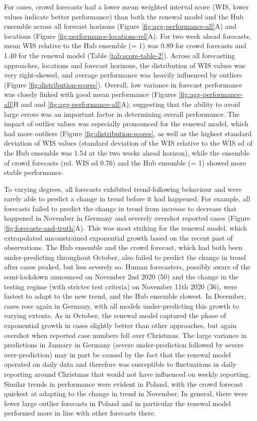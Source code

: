 \documentclass[
]{article}
\providecommand{\DIFaddtex}[1]{{\protect\color{blue}\uwave{#1}}} %
\providecommand{\DIFaddbegin}{} %
\providecommand{\DIFaddend}{} %
\providecommand{\DIFadd}[1]{\texorpdfstring{\DIFaddtex{#1}}{#1}} %
\newcommand{\DIFaddincludegraphics}[2][]{{\color{blue}\fbox{\DIFOincludegraphics[#1]{#2}}}} %
\DeclareRobustCommand{\DIFaddbegin}{\DIFOaddbegin \let\includegraphics\DIFaddincludegraphics} %
\DeclareRobustCommand{\DIFaddend}{\DIFOaddend \let\includegraphics\DIFOincludegraphics} %
\begin{document}
For cases, crowd forecasts had a lower mean weighted interval score (WIS, lower values indicate better performance) than both the renewal model and the Hub ensemble across all forecast horizons (Figure \ref{fig:agg-performance-all}A) and locations (Figure \ref{fig:performance-locations-rel}A). For two week ahead forecasts, mean WIS relative to the Hub ensemble (= 1) was 0.89 for crowd forecasts and 1.40 for the renewal model (Table \ref{tab:score-table-2}). Across all forecasting approaches, locations and forecast horizons, the distribution of WIS values was very right-skewed, and average performance was heavily influenced by outliers (Figure \ref{fig:distribution-scores}). Overall, low variance in forecast performance was closely linked with good mean performance (Figures \ref{fig:agg-performance-all}H and and \ref{fig:agg-performance-all}A), suggesting that the ability to avoid large errors was an important factor in determining overall performance. The impact of outlier values was especially pronounced for the renewal model, which had more outliers (Figure \ref{fig:distribution-scores}\DIFaddbegin \DIFadd{)}\DIFaddend , as well as the highest standard deviation of WIS values (standard deviation of the WIS relative to the WIS sd of the Hub ensemble was 1.54 at the two weeks ahead horizon), while the ensemble of crowd forecasts (rel. WIS sd 0.76) and the Hub ensemble (= 1) showed more stable performance.

To varying degrees, all forecasts exhibited trend-following behaviour and were rarely able to predict a change in trend before it had happened. For example, all forecasts failed to predict the change in trend from increase to decrease that happened in November in Germany and severely overshot reported cases (Figure \ref{fig:forecasts-and-truth}A). This was most striking for the renewal model, which extrapolated unconstrained exponential growth based on the recent past of observations. The Hub ensemble and the crowd forecast, which had both been under-predicting throughout October, also failed to predict the change in trend after cases peaked, but less severely so. Human forecasters, possibly aware of the semi-lockdown announced on November 2nd 2020 (50) and the change in the testing regime (with stricter test criteria) on November 11th 2020 (36), were fastest to adapt to the new trend, and the Hub ensemble slowest. In December, cases rose again in Germany, with all models under-predicting this growth to varying extents. As in October, the renewal model captured the phase of exponential growth in cases slightly better than other approaches, but again overshot when reported case numbers fell over Christmas. The large variance in predictions in January in Germany (severe under-prediction followed by severe over-prediction) may in part be caused by the fact that the renewal model operated on daily data and therefore was susceptible to fluctuations in daily reporting around Christmas that would not have influenced on weekly reporting. Similar trends in performance were evident in Poland, with the crowd forecast quickest at adapting to the change in trend in November. In general, there were fewer large outlier forecasts in Poland and in particular the renewal model performed more in line with other forecasts there.
\end{document}
